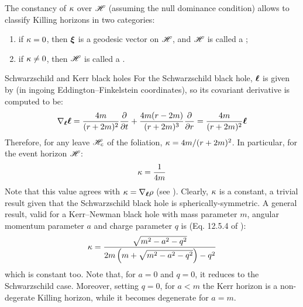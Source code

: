The constancy of $ \kappa $ over $ \mathscr{H} $ (assuming the null dominance condition) allows to classify Killing horizons in two categories:
\begin{enumerate}
  \item if $ \kappa = 0 $, then $ \boldsymbol{\xi} $ is a geodesic vector on $ \mathscr{H} $, and $ \mathscr{H} $ is called a ;
  \item if $ \kappa \neq 0 $, then $ \mathscr{H} $ is called a .
\end{enumerate}

\begin{example}{Schwarzschild and Kerr black holes}{}
  For the Schwarzschild black hole, $ \boldsymbol{\ell} $ is given by  (in ingoing Eddington--Finkelstein coordinates), so its covariant derivative is computed to be:
  \begin{equation}
    \nabla_{\boldsymbol{\ell}} \boldsymbol{\ell} = \frac{4m}{(r + 2m)^2} \frac{\partial}{\partial t} + \frac{4m (r - 2m)}{(r + 2m)^3} \frac{\partial}{\partial r} = \frac{4m}{(r + 2m)^2} \boldsymbol{\ell}
    \label{eq:in-edd-fink}
  \end{equation}
  Therefore, for any leave $ \mathscr{H}_c $ of the foliation, $ \kappa = 4m / (r + 2m)^2 $. In particular, for the event horizon $ \mathscr{H} $:
  \begin{equation}
    \kappa = \frac{1}{4m}
  \end{equation}
  Note that this value agrees with $ \kappa = \nabla_{\boldsymbol{\ell}} \rho $ (see ). Clearly, $ \kappa $ is a constant, a trivial result given that the Schwarzschild black hole is spherically-symmetric. A general result, valid for a Kerr--Newman black hole with mass parameter $ m $, angular momentum parameter $ a $ and charge parameter $ q $ is (Eq. 12.5.4 of \cite{wald}):
  \begin{equation}
    \kappa = \frac{\sqrt{m^2 - a^2 - q^2}}{2m \left( m + \sqrt{m^2 - a^2 - q^2} \right) - q^2}
  \end{equation}
  which is constant too. Note that, for $ a = 0 $ and $ q = 0 $, it reduces to the Schwarzschild case. Moreover, setting $ q = 0 $, for $ a < m $ the Kerr horizon is a non-degerate Killing horizon, while it becomes degenerate for $ a = m $.
\end{example}

